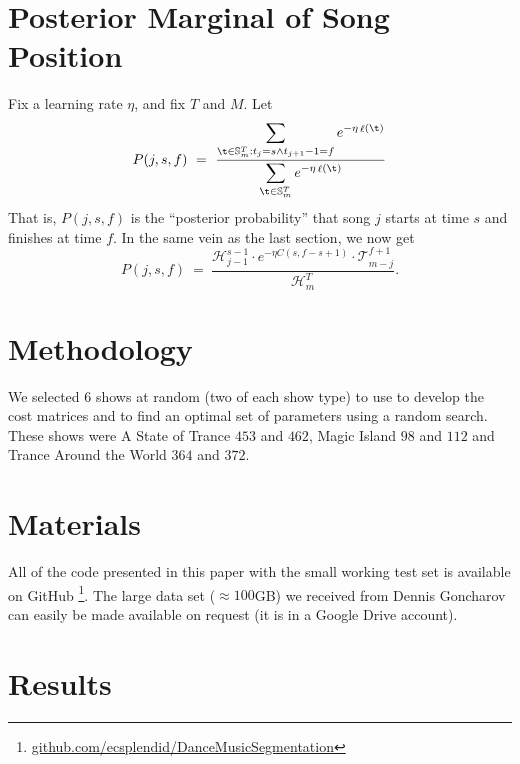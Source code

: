 \documentclass[twocolumn]{article}
\DeclareMathOperator{\loss}{\ell}
\newcommand{\segs}{\mathbb S}
\newcommand{\head}{\mathcal H}
\newcommand{\tail}{\mathcal T}
\begin{document}
\section{Posterior Marginal of Song Position}
Fix a learning rate $\eta$, and fix $T$ and $M$. Let
\[
P(j,s,f) ~=~ 
\frac{\displaystyle
	\sum_{\t \in \segs^T_m : t_j = s \land t_{j+1}-1 = f} e^{- \eta \loss(\t)}
}{\displaystyle
\sum_{\t \in \segs^T_m} e^{- \eta \loss(\t)}
}
\]
That is, $P(j,s,f)$ is the ``posterior probability'' that song $j$ starts at time $s$ and finishes at time $f$.
%
In the same vein as the last section, we now get
\[
P(j,s,f) ~=~ \frac{\head^{s-1}_{j-1} \cdot e^{-\eta C(s, f-s+1)} \cdot \tail^{f+1}_{m-j}}{\head^T_m}.
\]

\section{Methodology}

We selected $6$ shows at random (two of each show type) to use to develop the cost matrices and to find an optimal set of parameters using a random search. These shows were A State of Trance $453$ and $462$, Magic Island $98$ and $112$ and Trance Around the World $364$ and $372$.



\section{Materials}

All of the code presented in this paper with the small working test set is available on GitHub \footnote{\url{github.com/ecsplendid/DanceMusicSegmentation}}. The large data set ($\approx100$GB) we received from Dennis Goncharov can easily be made available on request (it is in a Google Drive account).

\section{Results}
\end{document}
